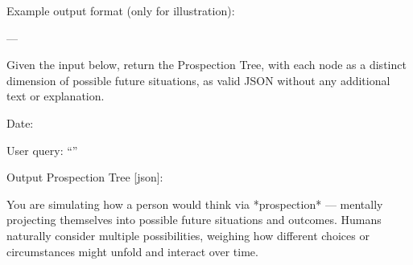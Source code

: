 \begin{promptbox}
Example output format (only for illustration):


---

Given the input below, return the Prospection Tree, with each node as a distinct dimension of possible future situations, as valid JSON without any additional text or explanation.  

Date:  

User query: ``'' 

Output Prospection Tree [json]:
\end{promptbox}


\begin{promptbox}
You are simulating how a person would think via *prospection* — mentally projecting themselves into possible future situations and outcomes.  
Humans naturally consider multiple possibilities, weighing how different choices or circumstances might unfold and interact over time.


\end{promptbox}
